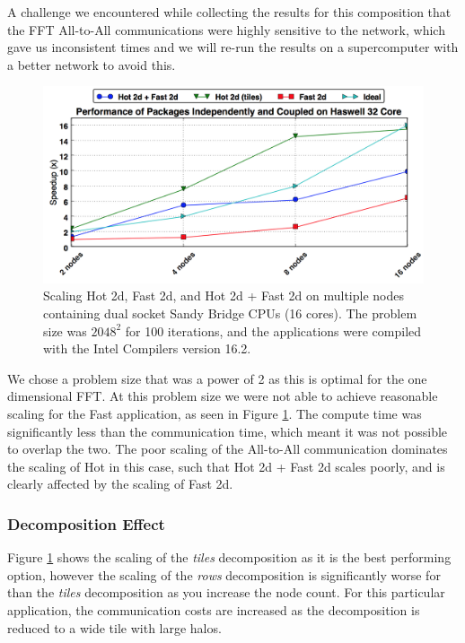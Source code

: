 \documentclass[runningheads,a4paper]{llncs}
\begin{document}
A challenge we encountered while collecting the results for this composition that the FFT All-to-All communications were highly sensitive to the network, which gave us inconsistent times and we will re-run the results on a supercomputer with a better network to avoid this.

\begin{figure}
  \centering
  \includegraphics[width=1.0\linewidth]{hot_fast_scaling}
  \caption{Scaling Hot 2d, Fast 2d, and Hot 2d + Fast 2d on multiple nodes containing dual socket Sandy Bridge CPUs (16 cores). The problem size was $2048^2$ for 100 iterations, and the applications were compiled with the Intel Compilers version 16.2.}
  \label{fig:scaling-hot-fast-sandybridge}
\end{figure}

We chose a problem size that was a power of 2 as this is optimal for the one dimensional FFT. At this problem size we were not able to achieve reasonable scaling for the Fast application, as seen in Figure \ref{fig:scaling-hot-fast-sandybridge}. The compute time was significantly less than the communication time, which meant it was not possible to overlap the two. The poor scaling of the All-to-All communication dominates the scaling of Hot in this case, such that Hot 2d + Fast 2d scales poorly, and is clearly affected by the scaling of Fast 2d. 

\subsubsection{Decomposition Effect}

Figure \ref{fig:scaling-hot-fast-sandybridge} shows the scaling of the \textit{tiles} decomposition as it is the best performing option, however the scaling of the \textit{rows} decomposition is significantly worse for than the \textit{tiles} decomposition as you increase the node count. For this particular application, the communication costs are increased as the decomposition is reduced to a wide tile with large halos.
\end{document}
